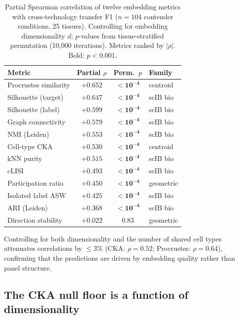 \documentclass[11pt]{article}
\begin{document}
\begin{table}[t]
\centering
\caption{Partial Spearman correlation of twelve embedding metrics with
cross-technology transfer F1 ($n = 104$ contender conditions, 25
tissues). Controlling for embedding dimensionality $d$; $p$-values from
tissue-stratified permutation (10,000 iterations). Metrics ranked by
$|\rho|$. Bold: $p < 0.001$.}
\label{tab:metrics}
\small
\begin{tabular}{@{}lccl@{}}
\toprule
Metric & Partial $\rho$ & Perm.\ $p$ & Family \\
\midrule
Procrustes similarity   & $+0.652$ & $\mathbf{< 10^{-4}}$ & centroid \\
Silhouette (target)     & $+0.647$ & $\mathbf{< 10^{-4}}$ & scIB bio \\
Silhouette (label)      & $+0.599$ & $\mathbf{< 10^{-4}}$ & scIB bio \\
Graph connectivity      & $+0.579$ & $\mathbf{< 10^{-4}}$ & scIB bio \\
NMI (Leiden)            & $+0.553$ & $\mathbf{< 10^{-4}}$ & scIB bio \\
Cell-type CKA           & $+0.530$ & $\mathbf{< 10^{-4}}$ & centroid \\
kNN purity              & $+0.515$ & $\mathbf{< 10^{-4}}$ & scIB bio \\
cLISI                   & $+0.493$ & $\mathbf{< 10^{-4}}$ & scIB bio \\
Participation ratio     & $+0.450$ & $\mathbf{< 10^{-4}}$ & geometric \\
Isolated label ASW      & $+0.425$ & $\mathbf{< 10^{-4}}$ & scIB bio \\
ARI (Leiden)            & $+0.368$ & $\mathbf{< 10^{-4}}$ & scIB bio \\
Direction stability     & $+0.022$ & $0.83$               & geometric \\
\bottomrule
\end{tabular}
\end{table}

Controlling for both dimensionality and the number of shared cell types
attenuates correlations by $\leq 3\%$ (CKA: $\rho = 0.52$; Procrustes:
$\rho = 0.64$), confirming that the predictions are driven by embedding
quality rather than panel structure.


\subsection{The CKA null floor is a function of dimensionality}
\label{sec:nullfloor}
\end{document}
